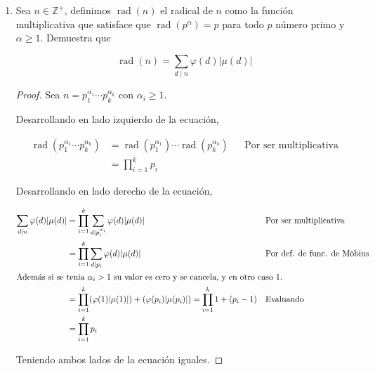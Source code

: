 \documentclass[letterpaper]{article}
\newcommand{\Z}{\mathbb{Z}}
\DeclareMathOperator{\rad}{rad}
\begin{document}
\begin{enumerate}
\item Sea $n \in \Z^+$, definimos $\rad(n)$ el radical de $n$ como la función multiplicativa que satisface que
$\rad(p^\alpha) = p$ para todo $p$ número primo y $\alpha \geq 1$. Demuestra que

\[ \rad(n) = \sum_{d \mid n} \varphi(d) |\mu(d)| \]

\begin{proof}
Sea $n = p_1^{\alpha_1} \cdots p_k^{\alpha_k}$ con $\alpha_i \geq 1$.

Desarrollando en lado izquierdo de la ecuación,

\begin{align*}
    \rad(p_1^{\alpha_1} \cdots p_k^{\alpha_k})
        &= \rad(p_1^{\alpha_1}) \cdots \rad(p_k^{\alpha_k})
        && \text{Por ser multiplicativa}\\
        &= \prod_{i=1}^k p_i
\end{align*}

Desarrollando en lado derecho de la ecuación,

\begin{align*}
    \sum_{d \mid n} \varphi(d) |\mu(d)|
        &= \prod_{i=1}^{k} \sum_{d \mid p_i^{\alpha_i}} \varphi(d) |\mu(d)|
            && \text{Por ser multiplicativa}\\
        &= \prod_{i=1}^{k} \sum_{d \mid p_i} \varphi(d) |\mu(d)|
        && \text{Por def. de func. de Möbius}\\
            \intertext{\centering
                Además si se tenia $\alpha_i > 1$ su valor es cero y se cancela, y en otro caso 1.}
        &= \prod_{i=1}^{k} (\varphi(1) |\mu(1)|) + (\varphi(p_i) |\mu(p_i)|)
            = \prod_{i=1}^{k} 1 + (p_i-1)
            && \text{Evaluando}\\
        &= \prod_{i=1}^{k} p_i
\end{align*}

Teniendo ambos lados de la ecuación iguales.
\end{proof}

\end{enumerate}






\end{document}
